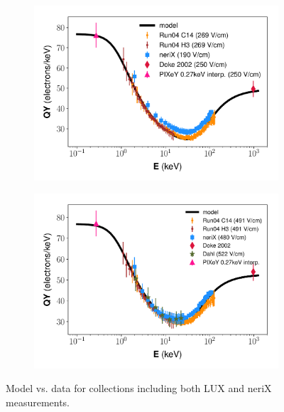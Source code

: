 \begin{figure}[!h]
\centering
\begin{subfigure}{0.5\linewidth}
\includegraphics[width=\linewidth]{Figures/Yields_fit_new/NEST_fit_250Vcm_new.pdf}
\caption{}
\end{subfigure}%
\begin{subfigure}{0.5\linewidth}
\includegraphics[width=\linewidth]{Figures/Yields_fit_new/NEST_fit_491Vcm_new.pdf}
\caption{}
\end{subfigure}
\caption{Model vs. data for collections including both LUX and neriX measurements.}
\label{fig:betamod_nerixcomp}
\end{figure}

